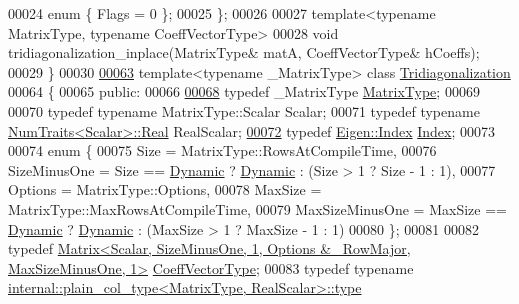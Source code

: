 \begin{DoxyCode}
00024   \textcolor{keyword}{enum} \{ Flags = 0 \};
00025 \};
00026 
00027 \textcolor{keyword}{template}<\textcolor{keyword}{typename} MatrixType, \textcolor{keyword}{typename} CoeffVectorType>
00028 \textcolor{keywordtype}{void} tridiagonalization\_inplace(MatrixType& matA, CoeffVectorType& hCoeffs);
00029 \}
00030 
\hyperlink{group___eigenvalues___module}{00063} \textcolor{keyword}{template}<\textcolor{keyword}{typename} \_MatrixType> \textcolor{keyword}{class }\hyperlink{group___eigenvalues___module_class_eigen_1_1_tridiagonalization}{Tridiagonalization}
00064 \{
00065   \textcolor{keyword}{public}:
00066 
\hyperlink{group___eigenvalues___module_add0f4b2216d0ea8ee0f7d8525deaf0a9}{00068}     \textcolor{keyword}{typedef} \_MatrixType \hyperlink{group___eigenvalues___module_add0f4b2216d0ea8ee0f7d8525deaf0a9}{MatrixType};
00069 
00070     \textcolor{keyword}{typedef} \textcolor{keyword}{typename} MatrixType::Scalar Scalar;
00071     \textcolor{keyword}{typedef} \textcolor{keyword}{typename} \hyperlink{group___core___module_struct_eigen_1_1_num_traits}{NumTraits<Scalar>::Real} RealScalar;
\hyperlink{group___eigenvalues___module_a7bd1f9fccec1e93b77a2214b2d30aae9}{00072}     \textcolor{keyword}{typedef} \hyperlink{namespace_eigen_a62e77e0933482dafde8fe197d9a2cfde}{Eigen::Index} \hyperlink{group___eigenvalues___module_a7bd1f9fccec1e93b77a2214b2d30aae9}{Index}; 
00073 
00074     \textcolor{keyword}{enum} \{
00075       Size = MatrixType::RowsAtCompileTime,
00076       SizeMinusOne = Size == \hyperlink{namespace_eigen_ad81fa7195215a0ce30017dfac309f0b2}{Dynamic} ? \hyperlink{namespace_eigen_ad81fa7195215a0ce30017dfac309f0b2}{Dynamic} : (Size > 1 ? Size - 1 : 1),
00077       Options = MatrixType::Options,
00078       MaxSize = MatrixType::MaxRowsAtCompileTime,
00079       MaxSizeMinusOne = MaxSize == \hyperlink{namespace_eigen_ad81fa7195215a0ce30017dfac309f0b2}{Dynamic} ? \hyperlink{namespace_eigen_ad81fa7195215a0ce30017dfac309f0b2}{Dynamic} : (MaxSize > 1 ? MaxSize - 1 : 1)
00080     \};
00081 
00082     \textcolor{keyword}{typedef} 
      \hyperlink{group___core___module}{Matrix<Scalar, SizeMinusOne, 1, Options & ~RowMajor, MaxSizeMinusOne, 1>}
       \hyperlink{group___core___module}{CoeffVectorType};
00083     \textcolor{keyword}{typedef} \textcolor{keyword}{typename} \hyperlink{class_eigen_1_1internal_1_1_tensor_lazy_evaluator_writable}{internal::plain\_col\_type<MatrixType, RealScalar>::type}

\end{DoxyCode}
